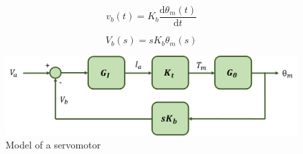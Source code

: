 \begin{equation}\label{feedback1}
v_{b}(t)= K_{b}\frac{\mathrm{d} \theta_{m}(t)}{\mathrm{d} t}
\end{equation}

\begin{equation}\label{feedback2}
V_{b}(s)= sK_{b}\theta_{m}(s)
\end{equation}

\begin{figure}[H]
\centering
\includegraphics[scale=0.6]{figures/model4.png}
\caption{Model of a servomotor}
\label{model4}
\end{figure}
